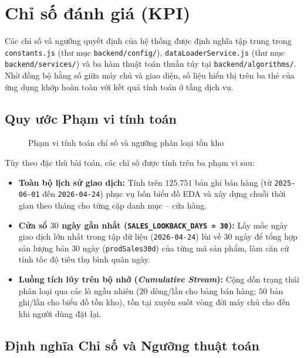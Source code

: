 \section{Chỉ số đánh giá (KPI)}
\label{sec:kpi}
Các chỉ số và ngưỡng quyết định của hệ thống được định nghĩa tập trung trong \texttt{constants.js} (thư mục \texttt{backend/config/}), \texttt{dataLoaderService.js} (thư mục \texttt{backend/services/}) và ba hàm thuật toán thuần túy tại \texttt{backend/algorithms/}. Nhờ đồng bộ hằng số giữa máy chủ và giao diện, số liệu hiển thị trên ba thẻ của ứng dụng khớp hoàn toàn với kết quả tính toán ở tầng dịch vụ.

\subsection{Quy ước Phạm vi tính toán}
\label{sec:kpi-scope}

\begin{figure}[H]
	\centering
	\caption{Phạm vi tính toán chỉ số và ngưỡng phân loại tồn kho}
	\label{fig:kpi_scope}
\end{figure}

Tùy theo đặc thù bài toán, các chỉ số được tính trên ba phạm vi sau:
\begin{itemize}
	\item \textbf{Toàn bộ lịch sử giao dịch:} Tính trên $125.751$ bản ghi bán hàng (từ \texttt{2025-06-01} đến \texttt{2026-04-24}) phục vụ bốn biểu đồ EDA và xây dựng chuỗi thời gian theo tháng cho từng cặp danh mục -- cửa hàng.
	\item \textbf{Cửa sổ $30$ ngày gần nhất (\texttt{SALES_LOOKBACK_DAYS = 30}):} Lấy mốc ngày giao dịch lớn nhất trong tập dữ liệu (\texttt{2026-04-24}) lùi về $30$ ngày để tổng hợp sản lượng bán $30$ ngày (\texttt{prodSales30d}) của từng mã sản phẩm, làm căn cứ tính tốc độ tiêu thụ bình quân ngày.
	\item \textbf{Luồng tích lũy trên bộ nhớ (\textit{Cumulative Stream}):} Cộng dồn trạng thái phân loại qua các lô ngẫu nhiên ($20$ dòng/lần cho bảng bán hàng; $50$ bản ghi/lần cho biểu đồ tồn kho), tồn tại xuyên suốt vòng đời máy chủ cho đến khi người dùng đặt lại.
\end{itemize}

\subsection{Định nghĩa Chỉ số và Ngưỡng thuật toán}
\label{sec:kpi-main}

